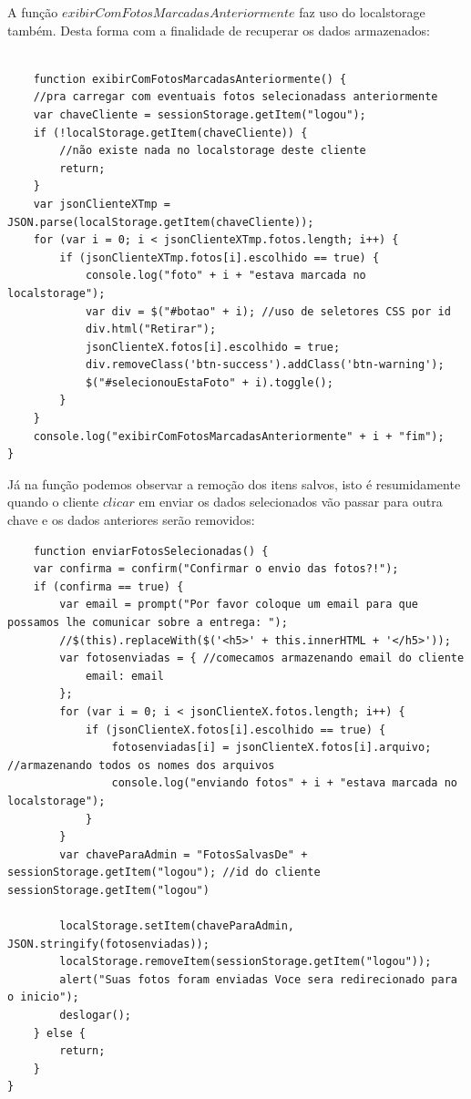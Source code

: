 	A função $exibirComFotosMarcadasAnteriormente$ faz uso do localstorage também. Desta forma com a finalidade de recuperar os dados armazenados:
\begin{lstlisting}	
	
	function exibirComFotosMarcadasAnteriormente() {
    //pra carregar com eventuais fotos selecionadass anteriormente
    var chaveCliente = sessionStorage.getItem("logou");
    if (!localStorage.getItem(chaveCliente)) {
        //não existe nada no localstorage deste cliente
        return;
    }
    var jsonClienteXTmp = JSON.parse(localStorage.getItem(chaveCliente));
    for (var i = 0; i < jsonClienteXTmp.fotos.length; i++) {
        if (jsonClienteXTmp.fotos[i].escolhido == true) {
            console.log("foto" + i + "estava marcada no localstorage");
            var div = $("#botao" + i); //uso de seletores CSS por id
            div.html("Retirar");
            jsonClienteX.fotos[i].escolhido = true;
            div.removeClass('btn-success').addClass('btn-warning');
            $("#selecionouEstaFoto" + i).toggle();
        }
    }
    console.log("exibirComFotosMarcadasAnteriormente" + i + "fim");
}

	\end{lstlisting}
	
	Já na função podemos observar a remoção dos itens salvos, isto é resumidamente quando o cliente $clicar$ em enviar os dados selecionados vão passar para outra chave e os dados anteriores serão removidos:
	\begin{lstlisting}	
	function enviarFotosSelecionadas() {
    var confirma = confirm("Confirmar o envio das fotos?!");
    if (confirma == true) {
        var email = prompt("Por favor coloque um email para que possamos lhe comunicar sobre a entrega: ");
        //$(this).replaceWith($('<h5>' + this.innerHTML + '</h5>'));
        var fotosenviadas = { //comecamos armazenando email do cliente
            email: email
        };
        for (var i = 0; i < jsonClienteX.fotos.length; i++) {
            if (jsonClienteX.fotos[i].escolhido == true) {
                fotosenviadas[i] = jsonClienteX.fotos[i].arquivo; //armazenando todos os nomes dos arquivos
                console.log("enviando fotos" + i + "estava marcada no localstorage");
            }
        }
        var chaveParaAdmin = "FotosSalvasDe" + sessionStorage.getItem("logou"); //id do cliente sessionStorage.getItem("logou")
        
        localStorage.setItem(chaveParaAdmin, JSON.stringify(fotosenviadas));
        localStorage.removeItem(sessionStorage.getItem("logou"));
        alert("Suas fotos foram enviadas Voce sera redirecionado para o inicio");
        deslogar();
    } else {
        return;
    }
}	
		\end{lstlisting}
